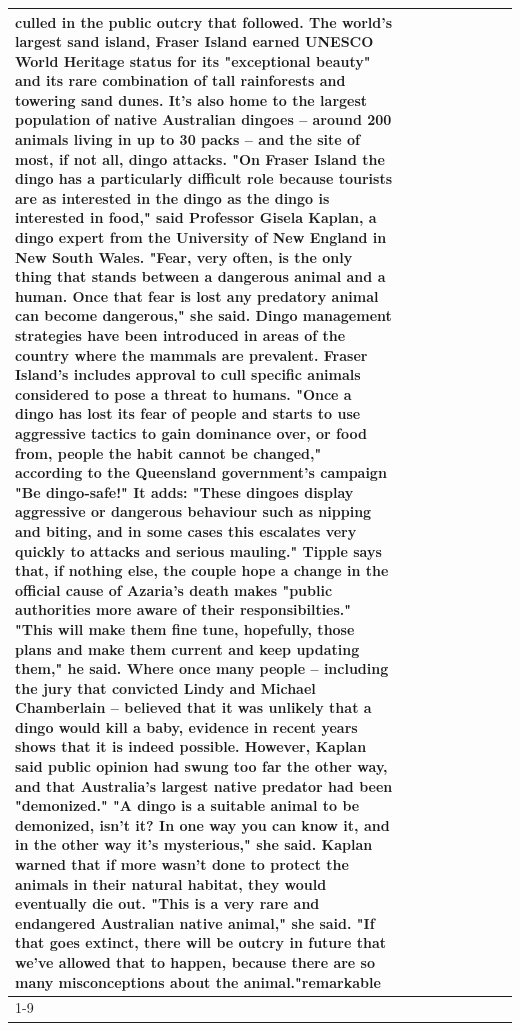 \begin{table}[H]
\begin{tabular}{lllrlllll}
culled in the public outcry that followed. The world's largest sand island, Fraser Island earned UNESCO World Heritage status for its "exceptional beauty" and its rare combination of tall rainforests and towering sand dunes. It's also home to the largest population of native Australian dingoes -- around 200 animals living in up to 30 packs -- and the site of most, if not all, dingo attacks. "On Fraser Island the dingo has a particularly difficult role because tourists are as interested in the dingo as the dingo is interested in food," said Professor Gisela Kaplan, a dingo expert from the University of New England in New South Wales. "Fear, very often, is the only thing that stands between a dangerous animal and a human. Once that fear is lost any predatory animal can become dangerous," she said. Dingo management strategies have been introduced in areas of the country where the mammals are prevalent. Fraser Island's includes approval to cull specific animals considered to pose a threat to humans. "Once a dingo has lost its fear of people and starts to use aggressive tactics to gain dominance over, or food from, people the habit cannot be changed," according to the Queensland government's campaign "Be dingo-safe!" It adds: "These dingoes display aggressive or dangerous behaviour such as nipping and biting, and in some cases this escalates very quickly to attacks and serious mauling." Tipple says that, if nothing else, the couple hope a change in the official cause of Azaria's death makes "public authorities more aware of their responsibilties." "This will make them fine tune, hopefully, those plans and make them current and keep updating them," he said. Where once many people -- including the jury that convicted Lindy and Michael Chamberlain -- believed that it was unlikely that a dingo would kill a baby, evidence in recent years shows that it is indeed possible. However, Kaplan said public opinion had swung too far the other way, and that Australia's largest native predator had been "demonized." "A dingo is a suitable animal to be demonized, isn't it? In one way you can know it, and in the other way it's mysterious," she said. Kaplan warned that if more wasn't done to protect the animals in their natural habitat, they would eventually die out. "This is a very rare and endangered Australian native animal," she said. "If that goes extinct, there will be outcry in future that we've allowed that to happen, because there are so many misconceptions about the animal."remarkable \\
\cline{1-9}
\bottomrule
\end{tabular}
\end{table}
